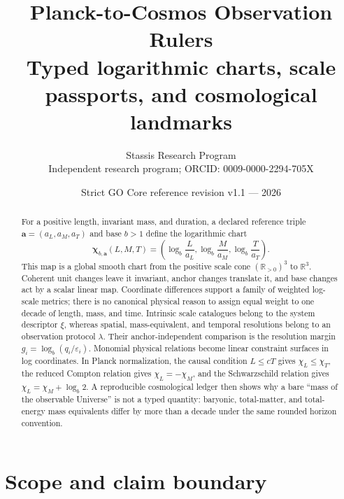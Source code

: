 \documentclass[11pt,a4paper]{article}
\title{\bfseries Planck-to-Cosmos Observation Rulers\\
\large Typed logarithmic charts, scale passports, and cosmological landmarks}
\author{Stassis Research Program\\
\small Independent research program; ORCID: 0009-0000-2294-705X}
\date{Strict GO Core reference revision v1.1 --- 2026}
\theoremstyle{definition}
\theoremstyle{plain}
\theoremstyle{remark}
\newcommand{\R}{\mathbb{R}}
\newcommand{\Rpos}{\mathbb{R}_{>0}}
\begin{document}
\maketitle

\begin{center}
\end{center}

\begin{abstract}
For a positive length, invariant mass, and duration, a declared reference
triple $\bm a=(a_L,a_M,a_T)$ and base $b>1$ define the logarithmic chart
\[
 \bm\chi_{b,\bm a}(L,M,T)
 =
 \left(
 \log_b\frac{L}{a_L},
 \log_b\frac{M}{a_M},
 \log_b\frac{T}{a_T}
 \right).
\]
This map is a global smooth chart from the positive scale cone
$(\Rpos)^3$ to $\R^3$. Coherent unit changes leave it invariant, anchor
changes translate it, and base changes act by a scalar linear map.
Coordinate differences support a family of weighted log-scale metrics;
there is no canonical physical reason to assign equal weight to one
decade of length, mass, and time. Intrinsic scale catalogues belong to
the system descriptor $\xi$, whereas spatial, mass-equivalent, and
temporal resolutions belong to an observation protocol $\lambda$.
Their anchor-independent comparison is the resolution margin
$g_i=\log_b(q_i/\varepsilon_i)$. Monomial physical relations become
linear constraint surfaces in log coordinates. In Planck normalization,
the causal condition $L\leq cT$ gives $\chi_L\leq\chi_T$, the reduced
Compton relation gives $\chi_L=-\chi_M$, and the Schwarzschild relation
gives $\chi_L=\chi_M+\log_b2$. A reproducible cosmological ledger then
shows why a bare ``mass of the observable Universe'' is not a typed
quantity: baryonic, total-matter, and total-energy mass equivalents
differ by more than a decade under the same rounded horizon convention.
\end{abstract}

\tableofcontents

\section{Scope and claim boundary}
\end{document}
